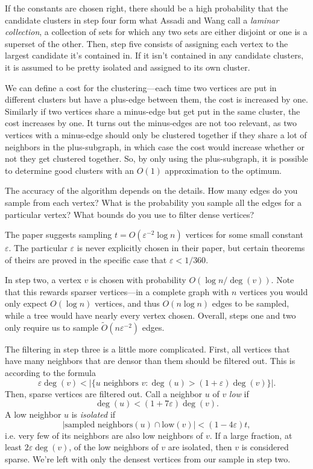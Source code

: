\documentclass[
]{article}
\begin{document}
If the constants are chosen right, there should be a high probability
that the candidate clusters in step four form what Assadi and Wang call
a \emph{laminar collection}, a collection of sets for which any two sets
are either disjoint or one is a superset of the other. Then,
step five consists of assigning each vertex to the largest candidate
it's contained in. If it isn't contained
in any candidate clusters, it is assumed to be pretty isolated and
assigned to its own cluster.

We can define a cost for the clustering---each time two vertices are
put in different clusters but have a plus-edge between them, the cost is
increased by one. Similarly if two vertices share a minus-edge but get
put in the same cluster, the cost increases by one. It turns out the
minus-edges are not too relevant, as two vertices with a minus-edge
should only be clustered together if they share a lot of neighbors in
the plus-subgraph, in which case the cost would increase whether or not
they get clustered together. So, by only using the plus-subgraph, it is
possible to determine good clusters with an {\(O(1)\)} approximation to
the optimum.

The accuracy of the algorithm depends on the details. How many edges do
you sample from each vertex? What is the probability you sample all the
edges for a particular vertex? What bounds do you use to filter dense
vertices?

The paper suggests sampling {\(t = O(\varepsilon^{- 2}\log n)\)}
vertices for some small constant {\(\varepsilon\)}. The particular
  {\(\varepsilon\)} is
never explicitly chosen in their paper, but certain theorems of theirs
are proved in the specific case that {\(\varepsilon < 1/360\)}.

In step two, a vertex {\(v\)} is chosen with probability
  {\(O(\log n/\deg(v))\)}. Note that this rewards sparser vertices---in a
complete graph with {\(n\)} vertices you would only expect
  {\(O(\log n)\)} vertices, and thus {\(O(n\log n)\)} edges to be sampled,
while a tree would have nearly every vertex chosen. Overall, steps one
and two only require us to sample
  {\(\tilde{O}(n\varepsilon^{- 2})\)} edges.

The filtering in step three is a little more complicated. First, all
vertices that have many neighbors that are densor than them should be filtered out. This is
according to the formula
  {\[\varepsilon\deg(v) < |\{ u\text{~neighbors~}v:\deg(u) > (1 + \varepsilon)\deg(v)\}|.\]}Then, sparse vertices are filtered out.
Call a neighbor $u$ of $v$ \emph{low} if
  {\[\deg(u) < (1 + 7\varepsilon)\deg(v).\]}A low neighbor {\(u\)} is
\emph{isolated} if
  {\[|\text{sampled\ neighbors}(u) \cap \text{low}(v)| < (1 - 4\varepsilon)t,\]}i.e.
very few of its neighbors are also low neighbors of {\(v\)}. If a large
fraction, at least {\(2\varepsilon\deg(v)\)}, of the low neighbors of
  {\(v\)} are isolated, then {\(v\)} is considered sparse.
We're left with only the densest vertices from our
sample in step two.
\end{document}
